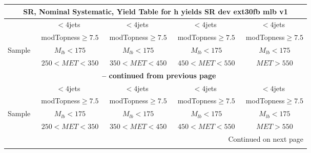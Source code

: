 \documentclass{article}
\begin{document}
 
 
 
 
\pagebreak 

 
 
 
 
\begin{longtable}{|l|c|c|c|c|} 
 
\multicolumn{5}{c}{ SR, Nominal Systematic, Yield Table for h yields SR dev ext30fb mlb v1 }\\* \hline 
  & $<4$jets  & $<4$jets  & $<4$jets  & $<4$jets \\* 
  & ~modTopness$\ge7.5$  & ~modTopness$\ge7.5$  & ~modTopness$\ge7.5$  & ~modTopness$\ge7.5$ \\* 
Sample  & ~$M_{lb}<175$  & ~$M_{lb}<175$  & ~$M_{lb}<175$  & ~$M_{lb}<175$ \\* 
  & ~$250<MET<350$  & ~$350<MET<450$  & ~$450<MET<550$  & ~$MET>550$ \\* 
\hline \hline 
\endfirsthead 
 
\multicolumn{5}{c}{{\bfseries \tablename\ \thetable{} -- continued from previous page}}\\* \hline 
  & $<4$jets  & $<4$jets  & $<4$jets  & $<4$jets \\* 
  & ~modTopness$\ge7.5$  & ~modTopness$\ge7.5$  & ~modTopness$\ge7.5$  & ~modTopness$\ge7.5$ \\* 
Sample  & ~$M_{lb}<175$  & ~$M_{lb}<175$  & ~$M_{lb}<175$  & ~$M_{lb}<175$ \\* 
  & ~$250<MET<350$  & ~$350<MET<450$  & ~$450<MET<550$  & ~$MET>550$ \\* 
\hline \hline 
\endhead 
 
\multicolumn{5}{|r|}{{Continued on next page}}\\* \hline 
\endfoot 
 
 
\endlastfoot 
 

\end{longtable}
\end{document}
